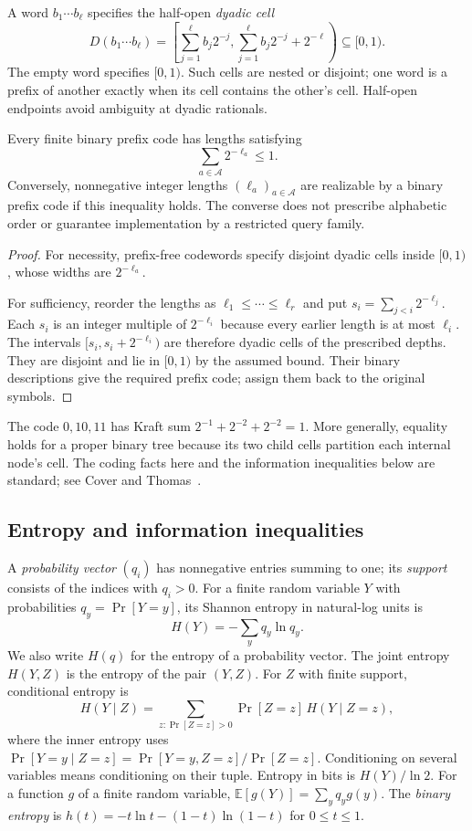 A word $b_1\cdots b_\ell$ specifies the half-open \emph{dyadic cell}
\[
 D(b_1\cdots b_\ell)=
 \left[\sum_{j=1}^{\ell}b_j2^{-j},
       \sum_{j=1}^{\ell}b_j2^{-j}+2^{-\ell}\right)
 \subseteq[0,1).
\]
The empty word specifies $[0,1)$. Such cells are nested or disjoint;
one word is a prefix of another exactly when its cell contains
the other's cell. Half-open endpoints avoid ambiguity at dyadic
rationals.

\begin{theorem}
\label{thm:kraft}
Every finite binary prefix code has lengths satisfying
\[
 \sum_{a\in\mathcal A}2^{-\ell_a}\le1.
\]
Conversely, nonnegative integer lengths $(\ell_a)_{a\in\mathcal A}$
are realizable by a binary prefix code if this inequality holds.
The converse does not prescribe alphabetic order or guarantee
implementation by a restricted query family.
\end{theorem}
\begin{proof}
For necessity, prefix-free codewords specify disjoint dyadic cells
inside $[0,1)$, whose widths are $2^{-\ell_a}$.

For sufficiency, reorder the lengths as
$\ell_1\le\cdots\le\ell_r$ and put
$s_i=\sum_{j<i}2^{-\ell_j}$. Each $s_i$ is an integer multiple
of $2^{-\ell_i}$ because every earlier length is at most $\ell_i$.
The intervals $[s_i,s_i+2^{-\ell_i})$ are therefore dyadic cells
of the prescribed depths. They are disjoint and lie in $[0,1)$
by the assumed bound. Their binary descriptions give the required
prefix code; assign them back to the original symbols.
\end{proof}

The code $0,10,11$ has Kraft sum
$2^{-1}+2^{-2}+2^{-2}=1$. More generally, equality holds for a
proper binary tree because its two child cells partition each
internal node's cell. The coding facts here and the information
inequalities below are standard; see Cover and Thomas~\cite{ct2006}.

\subsection{Entropy and information inequalities}

\begin{definition}\label{def:entropy}
A \emph{probability vector} $(q_i)$ has nonnegative entries summing
to one; its \emph{support} consists of the indices with $q_i>0$.
For a finite random variable $Y$ with probabilities
$q_y=\Pr[Y=y]$, its Shannon entropy in natural-log units is
\[
 H(Y)=-\sum_y q_y\ln q_y.
\]
We also write $H(q)$ for the entropy of a probability vector.
The joint entropy $H(Y,Z)$ is the entropy of the pair $(Y,Z)$.
For $Z$ with finite support, conditional entropy is
\[
 H(Y\mid Z)=
 \sum_{z:\Pr[Z=z]>0}\Pr[Z=z]\,H(Y\mid Z=z),
\]
where the inner entropy uses
$\Pr[Y=y\mid Z=z]=\Pr[Y=y,Z=z]/\Pr[Z=z]$.
Conditioning on several variables means
conditioning on their tuple. Entropy in bits is $H(Y)/\ln2$.
For a function $g$ of a finite random variable,
$\mathbb E[g(Y)]=\sum_y q_y g(y)$.
The \emph{binary entropy} is
$h(t)=-t\ln t-(1-t)\ln(1-t)$ for $0\le t\le1$.
\end{definition}

